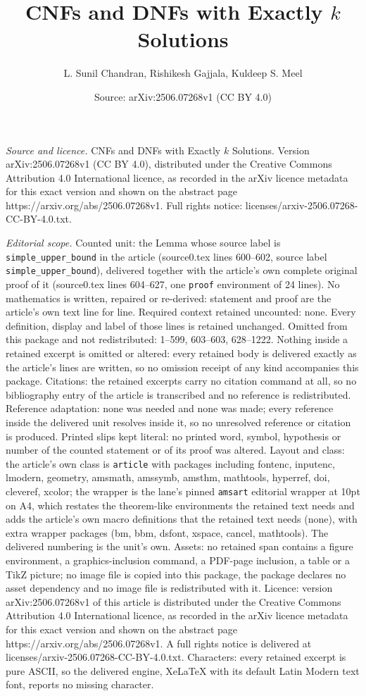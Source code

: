 \documentclass[10pt,a4paper]{amsart}
\title[CNFs and DNFs with Exactly $k$ Solutions]{CNFs and DNFs with Exactly $k$ Solutions}
\author{L. Sunil Chandran, Rishikesh Gajjala, Kuldeep S. Meel}
\date{Source: arXiv:2506.07268v1 (CC BY 4.0)}
\begin{document}
\maketitle

\noindent\emph{Source and licence.} CNFs and DNFs with Exactly $k$ Solutions. Version arXiv:2506.07268v1 (CC BY 4.0), distributed under the Creative Commons Attribution 4.0 International licence, as recorded in the arXiv licence metadata for this exact version and shown on the abstract page https://arxiv.org/abs/2506.07268v1. Full rights notice: licenses/arxiv-2506.07268-CC-BY-4.0.txt.\par\smallskip

\noindent\textit{Editorial scope.} Counted unit: the Lemma whose source label is \texttt{simple\_upper\_bound} in the article (source0.tex lines 600--602, source label \texttt{simple\_upper\_bound}), delivered together with the article's own complete original proof of it (source0.tex lines 604--627, one \texttt{proof} environment of 24 lines). No mathematics is written, repaired or re-derived: statement and proof are the article's own text line for line. Required context retained uncounted: none. Every definition, display and label of those lines is retained unchanged. Omitted from this package and not redistributed: 1--599, 603--603, 628--1222. Nothing inside a retained excerpt is omitted or altered: every retained body is delivered exactly as the article's lines are written, so no omission receipt of any kind accompanies this package. Citations: the retained excerpts carry no citation command at all, so no bibliography entry of the article is transcribed and no reference is redistributed. Reference adaptation: none was needed and none was made; every reference inside the delivered unit resolves inside it, so no unresolved reference or citation is produced. Printed slips kept literal: no printed word, symbol, hypothesis or number of the counted statement or of its proof was altered. Layout and class: the article's own class is \texttt{article} with packages including fontenc, inputenc, lmodern, geometry, amsmath, amssymb, amsthm, mathtools, hyperref, doi, cleveref, xcolor; the wrapper is the lane's pinned \texttt{amsart} editorial wrapper at 10pt on A4, which restates the theorem-like environments the retained text needs and adds the article's own macro definitions that the retained text needs (none), with extra wrapper packages (bm, bbm, dsfont, xspace, cancel, mathtools). The delivered numbering is the unit's own. Assets: no retained span contains a figure environment, a graphics-inclusion command, a PDF-page inclusion, a table or a TikZ picture; no image file is copied into this package, the package declares no asset dependency and no image file is redistributed with it. Licence: version arXiv:2506.07268v1 of this article is distributed under the Creative Commons Attribution 4.0 International licence, as recorded in the arXiv licence metadata for this exact version and shown on the abstract page https://arxiv.org/abs/2506.07268v1. A full rights notice is delivered at licenses/arxiv-2506.07268-CC-BY-4.0.txt. Characters: every retained excerpt is pure ASCII, so the delivered engine, XeLaTeX with its default Latin Modern text font, reports no missing character.
\end{document}
